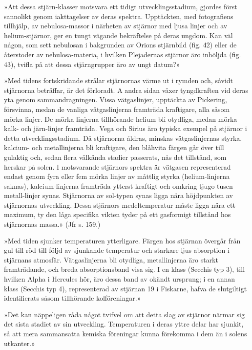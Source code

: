 \documentclass[a4paper, 12pt, oneside, swedish]{article}
\begin{document}
»Att dessa stjärn-klasser motsvara ett tidigt utvecklingsstadium, gjordes först sannolikt genom iakttagelser av deras spektra. Upptäckten, med fotografiens tillhjälp, av nebulosa-massor i närheten av stjärnor med ljusa linjer och av helium-stjärnor, ger en tungt vägande bekräftelse på deras ungdom. Kan väl någon, som sett nebulosan i bakgrunden av Orions stjärnbild (fig. 42) eller de återstoder av nebulosa-materia, i hvilken Plejadernas stjärnor äro inhöljda (fig. 43), tvifla på att dessa stjärngrupper äro av ungt datum?»

»Med tidens fortskridande strålar stjärnornas värme ut i rymden och, såvidt stjärnorna beträffar, är det förloradt. A andra sidan växer tyngdkraften vid deras yta genom sammandragningen. Vissa vätgaslinjer, upptäckta av Pickering, försvinna, medan de vanliga vätgaslinjerna framträda kraftigare, alla såsom mörka linjer. De mörka linjerna tillhörande helium bli otydliga, medan mörka kalk- och järn-linjer framträda. Vega och Sirius äro typiska exempel på stjärnor i detta utvecklingsstadium. Då stjärnorna åldras, minskas vätgaslinjernas styrka, kalcium- och metallinjerna bli kraftigare, den blåhvita färgen går över till gulaktig och, sedan flera välkända stadier passerats, nås det tillstånd, som herskar på solen. I motsvarande stjärnors spektra är vätgasen representerad endast genom fyra eller fem mörka linjer av måttlig styrka (helium-linjerna saknas), kalcium-linjerna framträda ytterst kraftigt och omkring tjugo tusen metall-linjer synas. Stjärnorna av sol-typen synas ligga nära höjdpunkten av stjärnornas utveckling. Dessa stjärnors medeltemperatur måste ligga nära ett maximum, ty den låga specifika vikten tyder på ett gasformigt tillstånd hos stjärnornas massa.» (Jfr s. 159.)

»Med tiden sjunker temperaturen ytterligare. Färgen hos stjärnan övergår från gul till röd till följd av sjunkande temperatur och starkare ljus-absorption i stjärnans atmosfär. Vätgaslinjerna bli otydliga, metallinjerna äro starkt framträdande, och breda absorptionsband visa sig. I en klass (Secchis typ 3), till hvilken Alpha i Hercules hör, äro dessa band av okändt ursprung; i en annan klass (Secchis typ 4), representerad av stjärnan 19 i Fiskarne, hafva de slutgiltigt identifierats såsom tillhörande kolföreningar.»

»Det kan näppeligen råda något tvifvel om att detta slag av stjärnor närmar sig det sista stadiet av sin utveckling. Temperaturen i deras yttre delar har sjunkit, så att mera sammansatta kemiska föreningar kunna förekomma i dem än i solens utkanter.»
\end{document}
